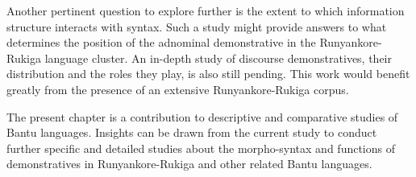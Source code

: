 \documentclass[output=paper 		  ]{langscibook}
\begin{document}
Another pertinent question to explore further is the extent to which information structure interacts with syntax. Such a study might provide answers to what determines the position of the adnominal demonstrative in the Run\-yan\-ko\-re-Ru\-ki\-ga language cluster. An in-depth study of discourse demonstratives, their distribution and the roles they play, is also still pending. This work would benefit greatly from the presence of an extensive Run\-yan\-ko\-re-Ru\-ki\-ga corpus.

The present chapter is a contribution to descriptive and comparative studies of Bantu languages. Insights can be drawn from the current study to conduct further specific and detailed studies about the morpho-syntax and functions of demonstratives in Run\-yan\-ko\-re-Ru\-ki\-ga and other related Bantu languages.
\end{document}
